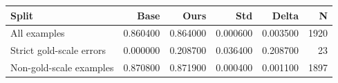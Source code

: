 \begin{tabular}{lrrrrr}
\toprule
Split & Base & Ours & Std & Delta & N \\
\midrule
All examples & 0.860400 & 0.864000 & 0.000600 & 0.003500 & 1920 \\
Strict gold-scale errors & 0.000000 & 0.208700 & 0.036400 & 0.208700 & 23 \\
Non-gold-scale examples & 0.870800 & 0.871900 & 0.000400 & 0.001100 & 1897 \\
\bottomrule
\end{tabular}
